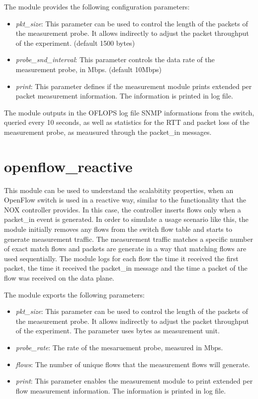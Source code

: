 \documentclass{book}
\begin{document}
The module provides the following configuration parameters:
\begin{itemize}
\item \emph{pkt\_size}:  This parameter can be used to control the length of the
packets of the measurement probe. It allows indirectly to adjust the packet
throughput of the experiment. (default 1500 bytes)
\item \emph{probe\_snd\_interval}: This parameter controls the data rate of the
measurement probe, in Mbps. (default 10Mbps)
\item \emph{print}: This parameter defines if the measurement module prints
extended per packet measurement information. The information is printed in log
file. 
\end{itemize}

The module outputs in the OFLOPS log file SNMP informations from the 
switch, queried every 10 seconds, as well as statistics for the RTT and packet 
loss of the measurement probe, as meausured through the packet\_in messages.

\section{openflow\_reactive}

This module can be used to understand the scalabitity properties, when an
OpenFlow switch is used in a reactive way, similar to the functionality that the NOX
controller provides. In this case, the controller inserts flows only when a
packet\_in event is generated. In order to simulate a usage scenario like 
this, the module initially removes any flows from the switch flow table and starts to generate
measurement traffic. The measurement traffic matches a specific number of
exact match flows and packets are generate in a way that matching flows are
used sequentially. The module logs for each flow the time it received the first
packet, the time it received the packet\_in message and the time a packet of the
flow was received on the data plane. 

The module exports the following parameters:
\begin{itemize}
\item \emph{pkt\_size}: This parameter can be used to control the length of the
packets of the measurement probe. It allows indirectly to adjust the packet
throughput of the experiment. The parameter uses bytes as measurement unit.
\item \emph{probe\_rate}: The rate of the mesaruement probe, measured in Mbps. 
\item \emph{flows}: The number of unique flows that the measurement flows will
generate.
\item \emph{print}:  This parameter enables the measurement module to print
extended per flow measurement information. The information is printed in log
file.
\end{itemize}
\end{document}
